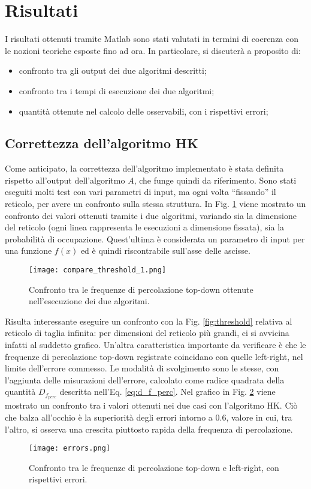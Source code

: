 \section{Risultati}
I risultati ottenuti tramite Matlab sono stati valutati in termini di coerenza con 
le nozioni teoriche esposte fino ad ora. In particolare, si discuterà a proposito di:
\begin{itemize}
    \item confronto tra gli output dei due algoritmi descritti;
    \item confronto tra i tempi di esecuzione dei due algoritmi;
    \item quantità ottenute nel calcolo delle osservabili, con i rispettivi errori;
\end{itemize}

\subsection*{Correttezza dell'algoritmo HK}
Come anticipato, la correttezza dell'algoritmo implementato è stata definita rispetto 
all'output dell'algoritmo $A$, che funge quindi da riferimento.
Sono stati eseguiti molti test con vari parametri di input, ma ogni volta 
``fissando'' il reticolo, per avere un confronto sulla stessa struttura.
In Fig. \ref{fig:compare_threshold} viene mostrato un confronto dei valori 
ottenuti tramite i due algoritmi, variando sia la dimensione del reticolo (ogni linea
rappresenta le esecuzioni a dimensione fissata), sia la probabilità di occupazione.
Quest'ultima è considerata un parametro di input per una funzione $f(x)$ ed è
quindi riscontrabile sull'asse delle ascisse. 
\begin{figure}[ht]
    \texttt{[image: compare\_threshold\_1.png]}
    \caption{Confronto tra le frequenze di percolazione top-down ottenute nell'esecuzione
    dei due algoritmi.}
    \label{fig:compare_threshold}
\end{figure}
Risulta interessante eseguire un confronto con la Fig. \ref{fig:threshold} 
relativa al reticolo di taglia infinita: per dimensioni del reticolo più grandi, ci 
si avvicina infatti al suddetto grafico.
Un'altra caratteristica importante da verificare è che le frequenze di 
percolazione top-down registrate coincidano con quelle left-right, nel limite 
dell'errore commesso. Le modalità di svolgimento sono le stesse, con l'aggiunta 
delle misurazioni dell'errore, calcolato come radice quadrata della quantità 
$D_{f_{perc}}$ descritta nell'Eq. \ref{eq:d_f_perc}.
Nel grafico in Fig. \ref{fig:th_errors} viene mostrato un confronto tra i valori 
ottenuti nei due casi con l'algoritmo HK. Ciò che balza all'occhio è la 
superiorità degli errori intorno a $0.6$, valore in cui, tra l'altro, 
si osserva una crescita piuttosto rapida della frequenza di percolazione.
\begin{figure}[ht]
    \texttt{[image: errors.png]}
    \caption{Confronto tra le frequenze di percolazione top-down e left-right,
    con rispettivi errori.}
    \label{fig:th_errors}
\end{figure}

